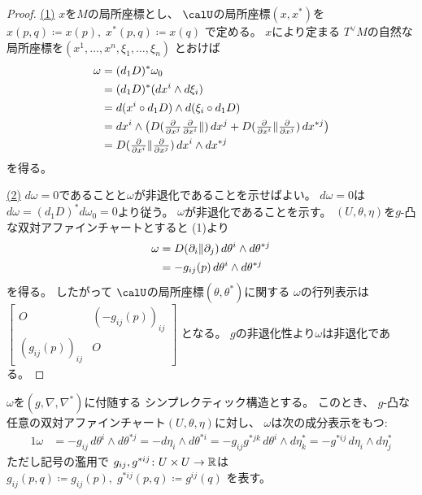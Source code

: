 \documentclass[report]{jlreq}
\begin{document}
\begin{proof}
    \uline{(1)} \quad
    $x$を$M$の局所座標とし、
    $\calU$の局所座標$(x, x^*)$を
    $x(p, q) \coloneqq x(p), \; x^*(p, q) \coloneqq x(q)$
    で定める。
    $x$により定まる
    $T^\vee M$の自然な局所座標を$(x^1, \dots, x^n, \xi_1, \dots, \xi_n)$
    とおけば
    \begin{alignat}{1}
        \omega
            &=
                (d_1 D)^* \omega_0
                \\
            &=
                (d_1 D)^* (dx^i \wedge d\xi_i)
                \\
            &=
                d(x^i \circ d_1 D) \wedge d(\xi_i \circ d_1 D)
                \\
            &=
                dx^i \wedge \myparen{
                    D(\tdeldel{x^j} \tdeldel{x^i} \|) \, dx^j
                    +
                    D(\tdeldel{x^i} \| \tdeldel{x^j}) \, dx^{*j}
                }
                \\
            &=
                D(\tdeldel{x^i} \| \tdeldel{x^j}) \,
                dx^i \wedge dx^{*j}
    \end{alignat}
    を得る。

    \uline{(2)} \quad
    $d\omega = 0$であることと$\omega$が非退化であることを示せばよい。
    $d\omega = 0$は$d\omega = (d_1 D)^* d\omega_0 = 0$より従う。
    $\omega$が非退化であることを示す。
    $(U, \theta, \eta)$を$g$-凸な双対アファインチャートとすると
    (1)より
    \begin{alignat}{1}
        \omega
            &=
                D(\partial_i \| \partial_j) \, d\theta^i \wedge d\theta^{*j}
                \\
            &=
                - g_{ij}(p) \, d\theta^i \wedge d\theta^{*j}
    \end{alignat}
    を得る。
    したがって
    $\calU$の局所座標$(\theta, \theta^*)$に関する
    $\omega$の行列表示は
    $\begin{bmatrix}
        O & (-g_{ij}(p))_{ij} \\
        (g_{ij}(p))_{ij} & O
    \end{bmatrix}$
    となる。
    $g$の非退化性より$\omega$は非退化である。
\end{proof}

\begin{proposition}
    $\omega$を$(g, \nabla, \nabla^*)$に付随する
    シンプレクティック構造とする。
    このとき、
    $g$-凸な任意の双対アファインチャート$(U, \theta, \eta)$に対し、
    $\omega$は次の成分表示をもつ:
    \begin{alignat}{1}
        \omega
            &=
                - g_{ij} \,
                d\theta^i \wedge d\theta^{*j}
            =
                - d\eta_i \wedge d\theta^{*i}
            =
                - g_{ij} g^{*jk} \,
                d\theta^i \wedge d\eta^*_k
            =
                - g^{*ij} \,
                d\eta_i \wedge d\eta^*_j
    \end{alignat}
    ただし記号の濫用で
    $g_{ij}, g^{*ij} \colon U \times U \to \mathbb{R}$は
    $g_{ij}(p, q) \coloneqq g_{ij}(p), \;
        g^{*ij}(p, q) \coloneqq g^{ij}(q)$
    を表す。
\end{proposition}
\end{document}
